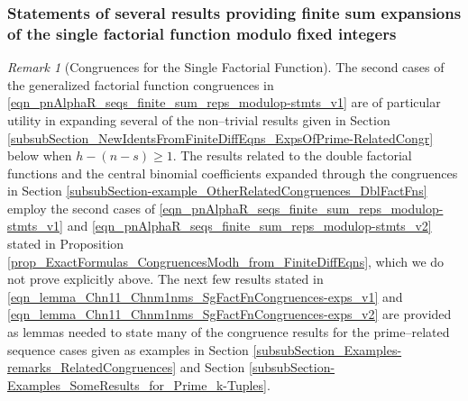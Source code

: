 \documentclass[12pt,reqno]{article}
\numberwithin{sfootnote}{section}
\numberwithin{equation}{section}
\theoremstyle{plain}
\theoremstyle{definition}
\theoremstyle{remark}
\newtheorem{remark}[theorem]{Remark}
\begin{document}
\subsubsection{Statements of several 
               results providing finite sum expansions of the 
               single factorial function modulo fixed integers} 

\begin{remark}[Congruences for the Single Factorial Function]  
\label{remark_lemma_new_congruences_for_the_SgFactFn} 
The second cases of the generalized factorial function congruences in 
\eqref{eqn_pnAlphaR_seqs_finite_sum_reps_modulop-stmts_v1} 
are of particular utility in expanding several of the non--trivial 
results given in 
Section \ref{subsubSection_NewIdentsFromFiniteDiffEqns_ExpsOfPrime-RelatedCongr} 
below when $h - (n-s) \geq 1$. 
The results related to the double factorial functions and the 
central binomial coefficients expanded through the congruences in 
Section \ref{subsubSection-example_OtherRelatedCongruences_DblFactFns} 
employ the second cases of 
\eqref{eqn_pnAlphaR_seqs_finite_sum_reps_modulop-stmts_v1} and 
\eqref{eqn_pnAlphaR_seqs_finite_sum_reps_modulop-stmts_v2} stated in 
Proposition \ref{prop_ExactFormulas_CongruencesModh_from_FiniteDiffEqns}, 
which we do not prove explicitly above. 
The next few results stated in 
\eqref{eqn_lemma_Chn11_Chnm1nms_SgFactFnCongruences-exps_v1} and 
\eqref{eqn_lemma_Chn11_Chnm1nms_SgFactFnCongruences-exps_v2} are 
provided as lemmas needed to state many of the congruence results for the 
prime--related sequence cases given as examples in 
Section \ref{subsubSection_Examples-remarks_RelatedCongruences} and 
Section \ref{subsubSection-Examples_SomeResults_for_Prime_k-Tuples}. 
\end{remark} 
\end{document}
